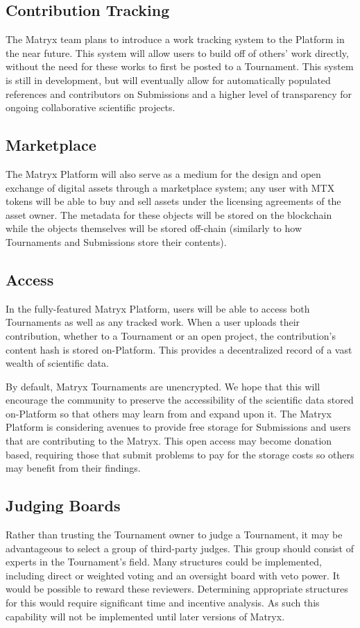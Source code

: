 \documentclass[a4paper, 10pt, conference]{ieeeconf}      %
\begin{document}
\subsection{Contribution Tracking} \label{contributiontracking}
The Matryx team plans to introduce a work tracking system to the Platform in the near future. This system will allow users to build off of others' work directly, without the need for these works to first be posted to a Tournament. This system is still in development, but will eventually allow for automatically populated references and contributors on Submissions and a higher level of transparency for ongoing collaborative scientific projects.

\subsection{Marketplace}\label{marketplace}
The Matryx Platform will also serve as a medium for the design and open exchange of digital assets through a marketplace system; any user with MTX tokens will be able to buy and sell assets under the licensing agreements of the asset owner. 
The metadata for these objects will be stored on the blockchain while the objects themselves will be stored off-chain (similarly to how Tournaments and Submissions store their contents).
\subsection{Access} \label{access}
In the fully-featured Matryx Platform, users will be able to access both Tournaments as well as any tracked work. 
When a user uploads their contribution, whether to a Tournament or an open project, the contribution's content hash is stored on-Platform.
This provides a decentralized record of a vast wealth of scientific data.

By default, Matryx Tournaments are unencrypted. We hope that this will encourage the community to preserve the accessibility of the scientific data stored on-Platform so that others may learn from and expand upon it.
The Matryx Platform is considering avenues to provide free storage for Submissions and users that are contributing to the Matryx.
This open access may become donation based, requiring those that submit problems to pay for the storage costs so others may benefit from their findings.

\subsection{Judging Boards} \label{judgingboards}
Rather than trusting the Tournament owner to judge a Tournament, it may be advantageous to select a group of third-party judges.
This group should consist of experts in the Tournament’s field. 
Many structures could be implemented, including direct or weighted voting and an oversight board with veto power. 
It would be possible to reward these reviewers. 
Determining appropriate structures for this would require significant time and incentive analysis.
As such this capability will not be implemented until later versions of Matryx.
\end{document}
